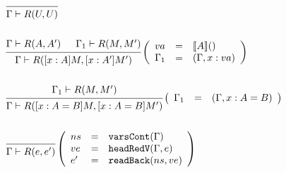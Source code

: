 \documentclass{article}
\theoremstyle{remark}
\begin{document}
\begin{align}
  &\begin{prooftree}
    \infer0{\Gamma \vdash R(U, U)} 
  \end{prooftree} \\
  \nonumber \\
  &\begin{prooftree}
    \hypo{\Gamma \vdash R(A, A')}
    \hypo{\Gamma_1 \vdash R(M, M')}
    \infer2{\Gamma \vdash R([x : A] M, [x : A'] M')} 
  \end{prooftree}\left(\begin{array}{l l l}
                         va &= & \llbracket A \rrbracket () \\
                         \Gamma_1 &= & (\Gamma, x : va)
                       \end{array}\right) \\
  \nonumber \\
  &\begin{prooftree}
    \hypo{\Gamma_1 \vdash R(M, M')}
    \infer1{\Gamma \vdash R([x : A = B] M, [x : A = B] M')} 
  \end{prooftree}\left(\begin{array}{l l l}
                         \Gamma_1 &= & (\Gamma, x : A = B)
                       \end{array}\right) \\
  \nonumber \\
  &\begin{prooftree}
    \infer0{\Gamma \vdash R(e, e')}
  \end{prooftree}\left(\begin{array}{l l l}
                         ns &= & \texttt{varsCont}(\Gamma) \\
                         ve &= & \texttt{headRedV}(\Gamma, e) \\
                         e' &= & \texttt{readBack}(ns, ve)
                       \end{array}\right)
\end{align}
\end{document}

